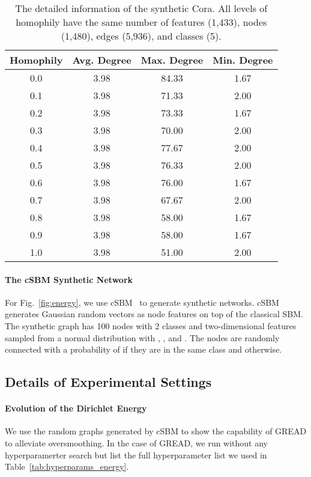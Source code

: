 \documentclass{article}
\theoremstyle{plain}
\theoremstyle{definition}
\theoremstyle{remark}
\begin{document}
\begin{table}[ht]
    \centering
    \caption{The detailed information of the synthetic Cora. All levels of homophily have the same number of features (1,433), nodes (1,480), edges (5,936), and classes (5).}
    \begin{tabular}{c ccc}\toprule
        Homophily & Avg. Degree & Max. Degree & Min. Degree\\ \midrule
        0.0 & 3.98 & 84.33 & 1.67 \\
        0.1 & 3.98 & 71.33 & 2.00 \\
        0.2 & 3.98 & 73.33 & 1.67 \\
        0.3 & 3.98 & 70.00 & 2.00 \\
        0.4 & 3.98 & 77.67 & 2.00 \\
        0.5 & 3.98 & 76.33 & 2.00 \\
        0.6 & 3.98 & 76.00 & 1.67 \\
        0.7 & 3.98 & 67.67 & 2.00 \\
        0.8 & 3.98 & 58.00 & 1.67 \\
        0.9 & 3.98 & 58.00 & 1.67 \\
        1.0 & 3.98 & 51.00 & 2.00 \\
        \bottomrule
    \end{tabular}
    \label{tab:syn_cora}
\end{table}

\paragraph{The cSBM Synthetic Network}
For Fig.~\ref{fig:energy}, we use cSBM~\cite{Deshpande2018cSBM} to generate synthetic networks. cSBM generates Gaussian random vectors as node features on top of the classical SBM. The synthetic graph has 100 nodes with 2 classes and two-dimensional features sampled from a normal distribution with , , and . The nodes are randomly connected with a probability of  if they are in the same class and  otherwise.

\subsection{Details of Experimental Settings}\label{a:setting}
\paragraph{Evolution of the Dirichlet Energy}
We use the random graphs generated by cSBM to show the capability of GREAD to alleviate oversmoothing. In the case of GREAD, we run without any hyperparamerter search but list the full hyperparameter list we used in Table~\ref{tab:hyperparams_energy}.
\end{document}
